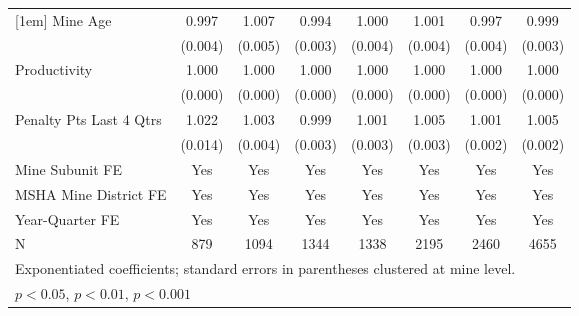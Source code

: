 {\begin{tabular}{l*{7}{c}}
[1em]
Mine Age                 &       0.997         &       1.007         &       0.994         &       1.000         &       1.001         &       0.997         &       0.999         \\
                         &     (0.004)         &     (0.005)         &     (0.003)         &     (0.004)         &     (0.004)         &     (0.004)         &     (0.003)         \\
[1em]
Productivity             &       1.000         &       1.000         &       1.000         &       1.000         &       1.000         &       1.000         &       1.000         \\
                         &     (0.000)         &     (0.000)         &     (0.000)         &     (0.000)         &     (0.000)         &     (0.000)         &     (0.000)         \\
[1em]
Penalty Pts Last 4 Qtrs  &       1.022         &       1.003         &       0.999         &       1.001         &       1.005         &       1.001         &       1.005\sym{*}  \\
                         &     (0.014)         &     (0.004)         &     (0.003)         &     (0.003)         &     (0.003)         &     (0.002)         &     (0.002)         \\
[1em]
Mine Subunit FE          &         Yes         &         Yes         &         Yes         &         Yes         &         Yes         &         Yes         &         Yes         \\
[1em]
MSHA Mine District FE    &         Yes         &         Yes         &         Yes         &         Yes         &         Yes         &         Yes         &         Yes         \\
[1em]
Year-Quarter FE          &         Yes         &         Yes         &         Yes         &         Yes         &         Yes         &         Yes         &         Yes         \\
\hline
N                        &         879         &        1094         &        1344         &        1338         &        2195         &        2460         &        4655         \\
\hline\hline
\multicolumn{8}{l}{\footnotesize Exponentiated coefficients; standard errors in parentheses clustered at mine level.}\\
\multicolumn{8}{l}{\footnotesize \sym{*} \(p<0.05\), \sym{**} \(p<0.01\), \sym{***} \(p<0.001\)}\\
\end{tabular}
}
